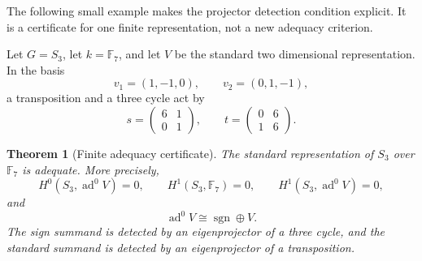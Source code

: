 \documentclass[11pt]{amsart}
\newtheorem{theorem}{Theorem}[section]
\theoremstyle{definition}
\theoremstyle{remark}
\newcommand{\FF}{\mathbb F}
\newcommand{\ad}{\operatorname{ad}}
\begin{document}
The following small example makes the projector detection condition explicit. It is a certificate for one finite representation, not a new adequacy criterion.

Let \(G=S_3\), let \(k=\FF_7\), and let \(V\) be the standard two dimensional representation. In the basis
\[
v_1=(1,-1,0),
\qquad
v_2=(0,1,-1),
\]
a transposition and a three cycle act by
\[
s=
\begin{pmatrix}
6&1\\
0&1
\end{pmatrix},
\qquad
t=
\begin{pmatrix}
0&6\\
1&6
\end{pmatrix}.
\]

\begin{theorem}[Finite adequacy certificate]\label{thm:s3_adequacy}
The standard representation of \(S_3\) over \(\FF_7\) is adequate. More precisely,
\[
H^0(S_3,\ad^0V)=0,
\qquad
H^1(S_3,\FF_7)=0,
\qquad
H^1(S_3,\ad^0V)=0,
\]
and
\[
\ad^0V\cong\operatorname{sgn}\oplus V.
\]
The sign summand is detected by an eigenprojector of a three cycle, and the standard summand is detected by an eigenprojector of a transposition.
\end{theorem}
\end{document}
